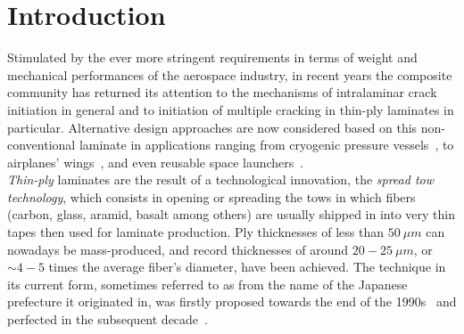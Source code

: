 \documentclass[review]{elsarticle}
\begin{document}
\linenumbers

\section{Introduction}

Stimulated by the ever more stringent requirements in terms of weight and mechanical performances of the aerospace industry, in recent years the composite community has returned its attention to the mechanisms of intralaminar crack initiation in general and to initiation of multiple cracking in thin-ply laminates in particular. Alternative design approaches are now considered based on this non-conventional laminate in applications ranging from cryogenic pressure vessels~\cite{McCarville2018}, to airplanes' wings~\cite{Kim2017}, and even reusable space launchers~\cite{Kopp2017}.\\
\emph{Thin-ply} laminates are the result of a technological innovation, the \emph{spread tow technology}, which consists in opening or spreading the tows in which fibers (carbon, glass, aramid, basalt among others) are usually shipped in into very thin tapes then used for laminate production. Ply thicknesses of less than $50\ \mu m$ can nowadays be mass-produced, and record thicknesses of around $20-25\ \mu m$, or $\sim 4-5$ times the average fiber's diameter, have been achieved. The technique in its current form, sometimes referred to as  from the name of the Japanese prefecture it originated in, was firstly proposed towards the end of the 1990s~\cite{Kawabe1997} and perfected in the subsequent decade~\cite{Kawabe2008,Kawabe2008en}.\\
\end{document}

